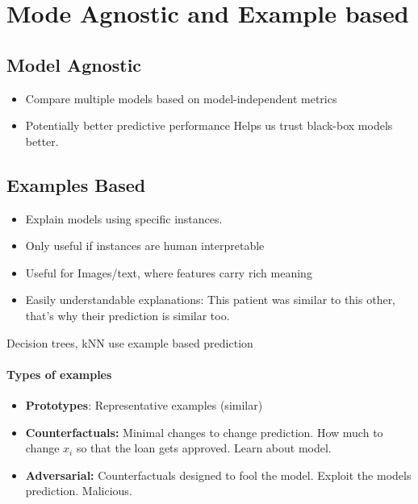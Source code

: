 \section{Mode Agnostic and Example based}
\subsection{Model Agnostic}
\begin{itemize}
	\item Compare multiple models based on model-independent metrics
	\item Potentially better predictive performance
	      Helps us trust black-box models better.
\end{itemize}

\subsection{Examples Based}

\begin{itemize}
	\item Explain models using specific instances.
	\item Only useful if instances are human interpretable
	\item Useful for Images/text, where features carry rich meaning
	\item Easily understandable explanations: This patient was similar to this other, that's why their prediction is similar too.
\end{itemize}
Decision trees, kNN use example based prediction
\paragraph{Types of examples}
\begin{itemize}
	\item \textbf{Prototypes}: Representative examples (similar)
	\item \textbf{Counterfactuals:} Minimal changes to change prediction. How much to change $x_i$ so that the loan gets approved. Learn about model.
	\item \textbf{Adversarial:} Counterfactuals designed to fool the model. Exploit the models prediction. Malicious.
\end{itemize}




